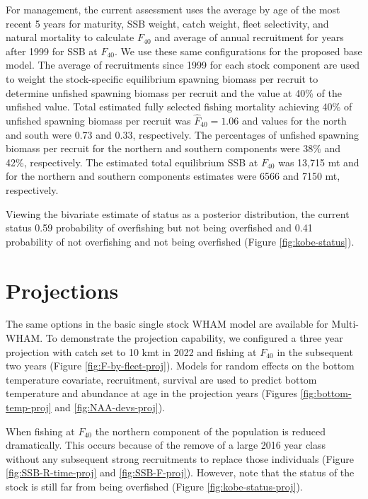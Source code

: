 \documentclass[
]{article}
\begin{document}
For management, the current assessment uses the average by age of the most recent 5 years for maturity, SSB weight, catch weight, fleet selectivity, and natural mortality to calculate \(F_{40}\) and average of annual recruitment for years after 1999 for SSB at \(F_{40}\). We use these same configurations for the proposed base model. The average of recruitments since 1999 for each stock component are used to weight the stock-specific equilibrium spawning biomass per recruit to determine unfished spawning biomass per recruit and the value at 40\% of the unfished value. Total estimated fully selected fishing mortality achieving 40\% of unfished spawning biomass per recruit was \(\widehat F_{40}= 1.06\) and values for the north and south were 0.73 and 0.33, respectively. The percentages of unfished spawning biomass per recruit for the northern and southern components were 38\% and 42\%, respectively. The estimated total equilibrium SSB at \(F_{40}\) was 13,715 mt and for the northern and southern components estimates were 6566 and 7150 mt, respectively.

Viewing the bivariate estimate of status as a posterior distribution, the current status 0.59 probability of overfishing but not being overfished and 0.41 probability of not overfishing and not being overfished (Figure \ref{fig:kobe-status}).

\hypertarget{projections}{%
\section{Projections}\label{projections}}

The same options in the basic single stock WHAM model are available for Multi-WHAM. To demonstrate the projection capability, we configured a three year projection with catch set to 10 kmt in 2022 and fishing at \(F_{40}\) in the subsequent two years (Figure \ref{fig:F-by-fleet-proj}). Models for random effects on the bottom temperature covariate, recruitment, survival are used to predict bottom temperature and abundance at age in the projection years (Figures \ref{fig:bottom-temp-proj} and \ref{fig:NAA-devs-proj}).

When fishing at \(F_{40}\) the northern component of the population is reduced dramatically. This occurs because of the remove of a large 2016 year class without any subsequent strong recruitments to replace those individuals (Figure \ref{fig:SSB-R-time-proj} and \ref{fig:SSB-F-proj}). However, note that the status of the stock is still far from being overfished (Figure \ref{fig:kobe-status-proj}).
\end{document}
